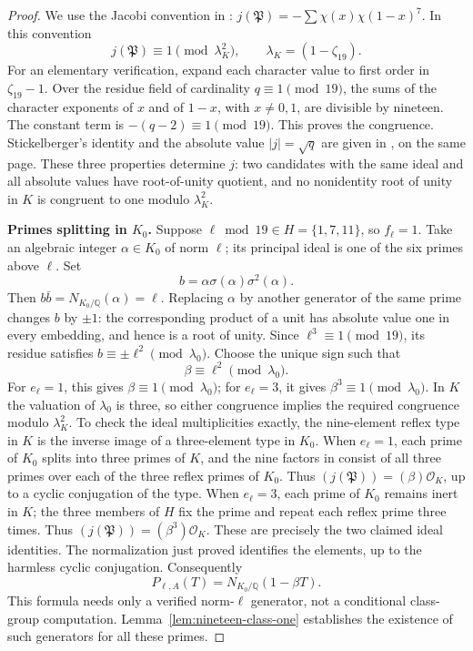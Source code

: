 \begin{proof}
We use the Jacobi convention in \citet[\S2.1, author p.~5]{ShuExpanded2021}: $j(\mathfrak P)=-\sum\chi(x)\chi(1-x)^7$.
In this convention
\[
 j(\mathfrak P)\equiv1\pmod{\lambda_K^2},
 \qquad \lambda_K=(1-\zeta_{19}).
\]
For an elementary verification, expand each character value
to first order in $\zeta_{19}-1$.  Over the residue field of
cardinality $q\equiv1\pmod{19}$, the sums of the character
exponents of $x$ and of $1-x$, with $x\ne0,1$, are divisible
by nineteen.  The constant term is $-(q-2)\equiv1\pmod{19}$.
This proves the congruence.  Stickelberger's identity and
the absolute value $|j|=\sqrt q$ are given in \citet[equation~(2.1), author p.~5]{ShuExpanded2021},
on the same page.  These three properties determine $j$:
two candidates with the same ideal and all absolute values
have root-of-unity quotient, and no nonidentity root of
unity in $K$ is congruent to one modulo $\lambda_K^2$.

\par\medskip\noindent\textbf{Primes splitting in $K_0$.} 
Suppose $\ell\bmod19\in H=\{1,7,11\}$, so $f_\ell=1$.
Take an algebraic integer $\alpha\in K_0$ of norm $\ell$;
its principal ideal is one of the six primes above $\ell$.
Set
\[
 b=\alpha\sigma(\alpha)\sigma^2(\alpha).
\]
Then $b\bar b=N_{K_0/\mathbb Q}(\alpha)=\ell$.
Replacing $\alpha$ by another generator of the same prime
changes $b$ by $\pm1$: the corresponding product of a unit
has absolute value one in every embedding, and hence is
a root of unity.  Since $\ell^3\equiv1\pmod{19}$, its
residue satisfies $b\equiv\pm\ell^2\pmod{\lambda_0}$.
Choose the unique sign such that
\[
 \beta\equiv\ell^2\pmod{\lambda_0}.
\]
For $e_\ell=1$, this gives $\beta\equiv1\pmod{\lambda_0}$;
for $e_\ell=3$, it gives $\beta^3\equiv1\pmod{\lambda_0}$.
In $K$ the valuation of $\lambda_0$ is three, so either
congruence implies the required congruence modulo
$\lambda_K^2$.  To check the ideal multiplicities exactly,
the nine-element reflex type in $K$ is the inverse image
of a three-element type in $K_0$.  When $e_\ell=1$, each
prime of $K_0$ splits into three primes of $K$, and the
nine factors in \citet[equation~(2.1), author p.~5]{ShuExpanded2021} consist of all three
primes over each of the three reflex primes of $K_0$.
Thus $(j(\mathfrak P))=(\beta)\mathcal O_K$, up to a
cyclic conjugation of the type.  When $e_\ell=3$, each
prime of $K_0$ remains inert in $K$; the three members
of $H$ fix the prime and repeat each reflex prime three
times.  Thus $(j(\mathfrak P))=(\beta^3)\mathcal O_K$.
These are precisely the two claimed ideal identities.
The normalization just proved identifies the elements,
up to the harmless cyclic conjugation.  Consequently
\[
 P_{\ell,A}(T)=N_{K_0/\mathbb Q}(1-\beta T).
\]
This formula needs only a verified norm-$\ell$ generator,
not a conditional class-group computation.  Lemma~\ref{lem:nineteen-class-one} establishes the existence
of such generators for all these primes.


\end{proof}
